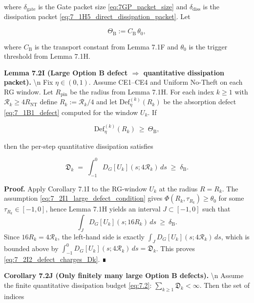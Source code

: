 \documentclass[
  11pt,
]{article}
\begin{document}
where \(\delta_{\mathrm{gate}}\) is the Gate packet size \eqref{eq:7GP_packet_size} and \(\delta_{\mathrm{diss}}\) is the dissipation packet \eqref{eq:7_1H5_direct_dissipation_packet}. Let

\begin{equation}
\Theta_{\mathrm{B}}
:= C_{\mathrm{B}}\,\theta_0,
\tag{7.2B2}\label{eq:7_2B2_ThetaB_def}
\end{equation}

where \(C_{\mathrm{B}}\) is the transport constant from Lemma 7.1F and \(\theta_0\) is the trigger threshold from Lemma 7.1H.

\textbf{Lemma 7.2I (Large Option B defect \(\Rightarrow\) quantitative dissipation packet).} \textbackslash n Fix \(\eta\in(0,1)\). Assume CE1--CE4 and Uniform No-Theft on each RG window. Let \(R_{\mathrm{pin}}\) be the radius from Lemma 7.1H. For each index \(k\ge1\) with \(\mathcal R_k\ge 4R_{\mathrm{NT}}\) define \(R_k:=\mathcal R_k/4\) and let \(\mathrm{Def}^{(k)}_{\eta}(R_k)\) be the absorption defect \eqref{eq:7_1B1_defect} computed for the window \(U_k\). If

\begin{equation}
\mathrm{Def}^{(k)}_{\eta}(R_k)\ \ge\ \Theta_{\mathrm{B}},
\tag{7.2I1}\label{eq:7_2I1_large_defect_condition}
\end{equation}

then the per-step quantitative dissipation satisfies

\begin{equation}
\mathfrak D_k
\;=\;\int_{-1}^{0}D_G[U_k](s;4\mathcal R_k)\,ds
\;\ge\;\delta_{\mathrm{B}}.
\tag{7.2I2}\label{eq:7_2I2_defect_charges_Dk}
\end{equation}

\textbf{Proof.} Apply Corollary 7.1I to the RG-window \(U_k\) at the radius \(R=R_k\). The assumption \eqref{eq:7_2I1_large_defect_condition} gives \(\Phi(R_k,\tau_{R_k})\ge\theta_0\) for some \(\tau_{R_k}\in[-1,0]\), hence Lemma 7.1H yields an interval \(J\subset[-1,0]\) such that \[
\int_J D_G[U_k](s;16R_k)\,ds\ \ge\ \delta_{\mathrm{B}}.
\] Since \(16R_k=4\mathcal R_k\), the left-hand side is exactly \(\int_J D_G[U_k](s;4\mathcal R_k)\,ds\), which is bounded above by \(\int_{-1}^{0}D_G[U_k](s;4\mathcal R_k)\,ds=\mathfrak D_k\). This proves \eqref{eq:7_2I2_defect_charges_Dk}. ∎

\textbf{Corollary 7.2J (Only finitely many large Option B defects).} \textbackslash n Assume the finite quantitative dissipation budget \eqref{eq:7.2}: \(\sum_{k\ge1}\mathfrak D_k<\infty\). Then the set of indices
\end{document}

